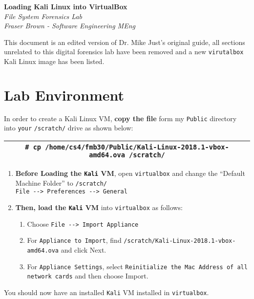 \documentclass[a4paper,11pt]{article}
\author{Fraser Brown}
\date{\today}
\begin{document}
   \begin{center}
      \Large\textbf{Loading Kali Linux into VirtualBox}\\
      \large\textit{File System Forensics Lab}\\
      \large\textit{Fraser Brown - Software Engineering MEng}
   \end{center}
   
This document is an edited version of Dr. Mike Just's original guide, all sections unrelated to this digital forensics lab have been removed and a new \texttt{virutalbox} Kali Linux image has been listed.

\section{Lab Environment}
In order to create a Kali Linux VM, \textbf{copy the file} form my \texttt{Public} directory into \texttt{your} \texttt{/scratch/} drive as shown below:\\
\begin{tabular}{|c|}
	\hline
		\texttt{{\#} cp /home/cs4/fmb30/Public/Kali-Linux-2018.1-vbox-amd64.ova /scratch/} \\
	\hline
\end{tabular}

\begin{enumerate}
	\item \textbf{Before Loading the \texttt{Kali} VM}, open \texttt{virtualbox} and change the ``Default Machine Folder'' to \texttt{/scratch/}\\ \verb|File --> Preferences --> General|
	\item \textbf{Then, load the \texttt{Kali} VM} into \texttt{virtualbox} as follows:
	\begin{enumerate}
		\item Choose \verb|File --> Import Appliance|
		\item For \texttt{Appliance to Import}, find \texttt{/scratch/Kali-Linux-2018.1-vbox-amd64.ova} and click Next.
		\item For \texttt{Appliance Settings}, select \texttt{Reinitialize the Mac Address of all network cards} and then choose Import.
	\end{enumerate}
\end{enumerate}

You should now have an installed \texttt{Kali} VM installed in \texttt{virtualbox}.
\end{document}
